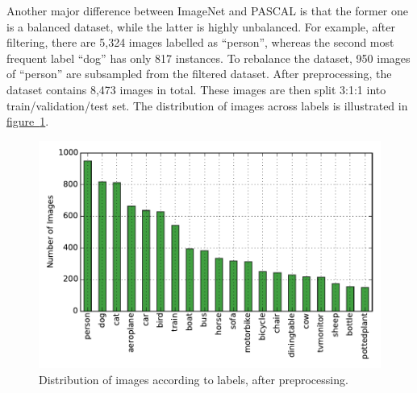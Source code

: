 \documentclass[11pt,a4paper]{article}
\begin{document}
Another major difference between ImageNet and PASCAL is that the former one is a balanced dataset, while the latter is highly unbalanced. For example, after filtering, there are 5,324 images labelled as ``person'', whereas the second most frequent label ``dog'' has only 817 instances. To rebalance the dataset, 950 images of ``person'' are subsampled from the filtered dataset.  After preprocessing, the dataset contains 8,473 images in total. These images are then split 3:1:1 into train/validation/test set. The distribution of images across labels is illustrated in \hyperref[fig:distro]{figure~\ref{fig:distro}}.
\begin{figure}[htbp]
\centering
\includegraphics[scale=0.8]{distro.pdf}
\caption{Distribution of images according to labels, after preprocessing.}
\label{fig:distro}
\end{figure}
\end{document}
